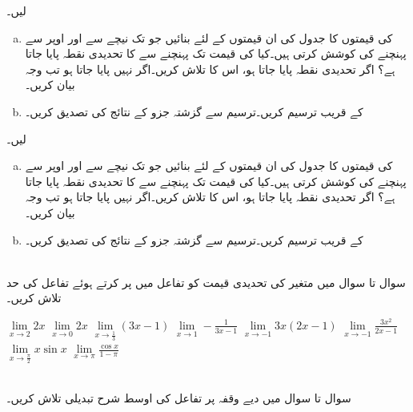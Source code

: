  لیں۔
\begin{enumerate}[a.]
\item
{} کی قیمتوں کا جدول  کی ان قیمتوں کے لئے بنائیں جو  تک نیچے سے اور اوپر سے پہنچنے کی کوشش کرتی ہیں۔کیا  کی قیمت  تک پہنچنے سے  کا تحدیدی نقطہ پایا جاتا ہے؟ اگر تحدیدی نقطہ پایا جاتا ہو، اس کا تلاش کریں۔اگر نہیں پایا جاتا ہو تب وجہ بیان کریں۔
\item
{} کے قریب  ترسیم کریں۔ترسیم سے گزشتہ جزو کے نتائج کی تصدیق کریں۔
\end{enumerate}
 لیں۔
\begin{enumerate}[a.]
\item
{} کی قیمتوں کا جدول  کی ان قیمتوں کے لئے بنائیں جو  تک نیچے سے اور اوپر سے پہنچنے کی کوشش کرتی ہیں۔کیا
  کی قیمت  تک پہنچنے سے  کا تحدیدی نقطہ پایا جاتا ہے؟ اگر تحدیدی نقطہ پایا جاتا ہو، اس کا تلاش کریں۔اگر نہیں پایا جاتا ہو تب وجہ بیان کریں۔
\item
{} کے قریب  ترسیم کریں۔ترسیم سے گزشتہ جزو کے نتائج کی تصدیق کریں۔
\end{enumerate}
\\
سوال  تا سوال  میں متغیر  کی تحدیدی قیمت کو تفاعل میں پر کرتے ہوئے تفاعل کی حد تلاش کریں۔

$\lim\limits_{x\to 2} 2x$
$\lim\limits_{x\to 0} 2x$
$\lim\limits_{x\to \tfrac{1}{3}} (3x-1)$
$\lim\limits_{x\to 1} -\tfrac{1}{3x-1}$
$\lim\limits_{x\to -1} 3x(2x-1)$
$\lim\limits_{x\to -1} \tfrac{3x^2}{2x-1}$
$\lim\limits_{x\to \tfrac{\pi}{2}} x\sin x$
$\lim\limits_{x\to \pi} \tfrac{\cos x}{1-\pi}$

\\
سوال  تا سوال  میں دیے وقفہ پر تفاعل کی اوسط شرح تبدیلی تلاش کریں۔

